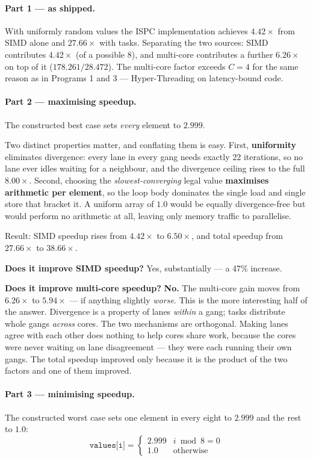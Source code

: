 \documentclass[11pt,a4paper]{article}
\begin{document}
\paragraph{Part 1 --- as shipped.} With uniformly random values the ISPC
implementation achieves $4.42\times$ from SIMD alone and $27.66\times$ with
tasks. Separating the two sources: SIMD contributes $4.42\times$ (of a possible
$8$), and multi-core contributes a further $6.26\times$ on top of it
($178.261/28.472$). The multi-core factor exceeds $C = 4$ for the same reason
as in Programs 1 and 3 --- Hyper-Threading on latency-bound code.

\paragraph{Part 2 --- maximising speedup.} The constructed best case sets
\emph{every} element to $2.999$.

Two distinct properties matter, and conflating them is easy. First,
\textbf{uniformity} eliminates divergence: every lane in every gang needs
exactly 22 iterations, so no lane ever idles waiting for a neighbour, and the
divergence ceiling rises to the full $8.00\times$. Second, choosing the
\emph{slowest-converging} legal value \textbf{maximises arithmetic per
element}, so the loop body dominates the single load and single store that
bracket it. A uniform array of $1.0$ would be equally divergence-free but would
perform no arithmetic at all, leaving only memory traffic to parallelise.

Result: SIMD speedup rises from $4.42\times$ to $\mathbf{6.50\times}$, and
total speedup from $27.66\times$ to $\mathbf{38.66\times}$.

\textbf{Does it improve SIMD speedup?} Yes, substantially --- a 47\% increase.

\textbf{Does it improve multi-core speedup?} \textbf{No.} The multi-core gain
moves from $6.26\times$ to $5.94\times$ --- if anything slightly \emph{worse}.
This is the more interesting half of the answer. Divergence is a property of
lanes \emph{within} a gang; tasks distribute whole gangs \emph{across} cores.
The two mechanisms are orthogonal. Making lanes agree with each other does
nothing to help cores share work, because the cores were never waiting on lane
disagreement --- they were each running their own gangs. The total speedup
improved only because it is the product of the two factors and one of them
improved.

\paragraph{Part 3 --- minimising speedup.} The constructed worst case sets one
element in every eight to $2.999$ and the rest to $1.0$:
\[
\texttt{values[i]} = \begin{cases}
2.999 & i \bmod 8 = 0 \\
1.0   & \text{otherwise}
\end{cases}
\]
\end{document}
